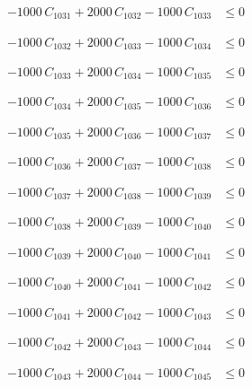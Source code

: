 \documentclass[a4paper,11pt]{article}
\begin{document}
\begin{align}
-1000\,C_{1031} + 2000\,C_{1032} - 1000\,C_{1033} &\leq 0 \nonumber
\end{align}

\begin{align}
-1000\,C_{1032} + 2000\,C_{1033} - 1000\,C_{1034} &\leq 0 \nonumber
\end{align}

\begin{align}
-1000\,C_{1033} + 2000\,C_{1034} - 1000\,C_{1035} &\leq 0 \nonumber
\end{align}

\begin{align}
-1000\,C_{1034} + 2000\,C_{1035} - 1000\,C_{1036} &\leq 0 \nonumber
\end{align}

\begin{align}
-1000\,C_{1035} + 2000\,C_{1036} - 1000\,C_{1037} &\leq 0 \nonumber
\end{align}

\begin{align}
-1000\,C_{1036} + 2000\,C_{1037} - 1000\,C_{1038} &\leq 0 \nonumber
\end{align}

\begin{align}
-1000\,C_{1037} + 2000\,C_{1038} - 1000\,C_{1039} &\leq 0 \nonumber
\end{align}

\begin{align}
-1000\,C_{1038} + 2000\,C_{1039} - 1000\,C_{1040} &\leq 0 \nonumber
\end{align}

\begin{align}
-1000\,C_{1039} + 2000\,C_{1040} - 1000\,C_{1041} &\leq 0 \nonumber
\end{align}

\begin{align}
-1000\,C_{1040} + 2000\,C_{1041} - 1000\,C_{1042} &\leq 0 \nonumber
\end{align}

\begin{align}
-1000\,C_{1041} + 2000\,C_{1042} - 1000\,C_{1043} &\leq 0 \nonumber
\end{align}

\begin{align}
-1000\,C_{1042} + 2000\,C_{1043} - 1000\,C_{1044} &\leq 0 \nonumber
\end{align}

\begin{align}
-1000\,C_{1043} + 2000\,C_{1044} - 1000\,C_{1045} &\leq 0 \nonumber
\end{align}
\end{document}
